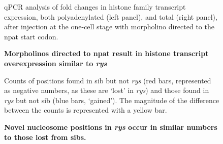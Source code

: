\documentclass{ut-thesis}
\begin{document}
\begin{NoHyper}
\begin{figure}[!h]
    \caption{{\bf Morpholinos directed to npat result in histone transcript overexpression similar to \textit{rys}}}
    qPCR analysis of fold changes in histone family transcript expression, both polyadenylated (left panel), and total (right panel), after injection at the one-cell stage with morpholino directed to the npat start codon.
    \label{morpholinoRTPCR}
\end{figure}

\begin{figure}[!h]
    \caption{{\bf Novel nucleosome positions in \textit{rys} occur in similar numbers to those lost from sibs.}}
    Counts of positions found in sib but not \textit{rys} (red bars, represented as negative numbers, as these are `lost' in \textit{rys}) and those found in \textit{rys} but not sib (blue bars, `gained'). The magnitude of the difference between the counts is represented with a yellow bar.
    \label{diffposdist}
\end{figure}


\end{NoHyper}
\end{document}

